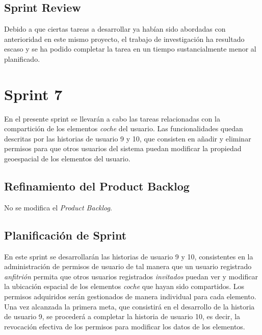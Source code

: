 	\subsection{Sprint Review}
	Debido a que ciertas tareas a desarrollar ya habían sido abordadas con anterioridad en este mismo proyecto, el trabajo de investigación ha resultado escaso y se ha podido completar la tarea en un tiempo sustancialmente menor al planificado.

\section{Sprint 7}
En el presente sprint se llevarán a cabo las tareas relacionadas con la compartición de los elementos \textit{coche} del usuario. Las funcionalidades quedan descritas por las historias de usuario 9 y 10, que consisten en añadir y eliminar permisos para que otros usuarios del sistema puedan modificar la propiedad geoespacial de los elementos del usuario.

	\subsection{Refinamiento del Product Backlog}
	No se modifica el \textit{Product Backlog}.
	
	\subsection{Planificación de Sprint}
	En este sprint se desarrollarán las historias de usuario 9 y 10, consistentes en la administración de permisos de usuario de tal manera que un usuario registrado \textit{anfitrión} permita que otros usuarios registrados \textit{invitados} puedan ver y modificar la ubicación espacial de los elementos \textit{coche} que hayan sido compartidos. Los permisos adquiridos serán gestionados de manera individual para cada elemento.
	Una vez alcanzada la primera meta, que consistirá en el desarrollo de la historia de usuario 9, se procederá a completar la historia de usuario 10, es decir, la revocación efectiva de los permisos para modificar los datos de los elementos.
	
